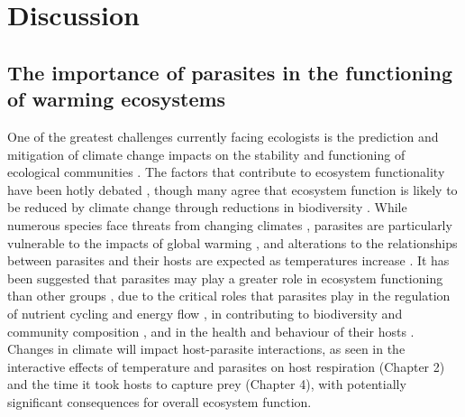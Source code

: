 \chapter{Discussion}
\label{chap:discussion}

%
%


\section{The importance of parasites in the functioning of warming ecosystems}

One of the greatest challenges currently facing ecologists is the prediction and mitigation of climate change impacts on the stability and functioning of ecological communities \citep{holling1973, walther2002, donohue2013, nouquet2015, hewitt2016, ullah2018}. The factors that contribute to ecosystem functionality have been hotly debated \citep{grime1997}, though many agree that ecosystem function is likely to be reduced by climate change through reductions in biodiversity \citep{traill2010}. While numerous species face threats from changing climates \citep{thomas2004}, parasites are particularly vulnerable to the impacts of global warming \citep{carlson2017}, and alterations to the relationships between parasites and their hosts are expected as temperatures increase \citep{hoberg2007}. It has been suggested that parasites may play a greater role in ecosystem functioning than other groups \citep{hatcher2012}, due to the critical roles that parasites play in the regulation of nutrient cycling and energy flow \cite{psato2012, buck2017, vannatta2018}, in contributing to biodiversity and community composition \citep{wood2007, grabner2017}, and in the health and behaviour of their hosts \citep{cable2017}. Changes in climate will impact host-parasite interactions, as seen in the interactive effects of temperature and parasites on host respiration (Chapter 2) and the time it took hosts to capture prey (Chapter 4), with potentially significant consequences for overall ecosystem function. 

